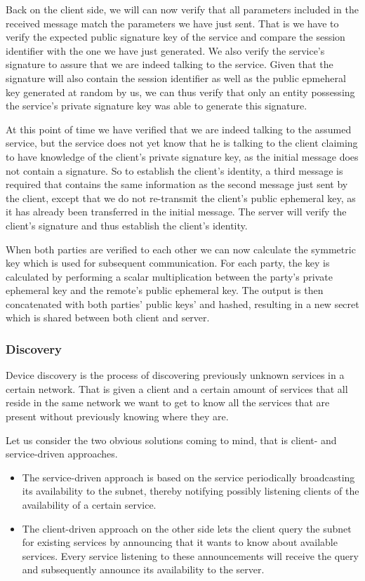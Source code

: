 Back on the client side, we will can now verify that all parameters included in the received message match the parameters we have just sent.
That is we have to verify the expected public signature key of the service and compare the session identifier with the one we have just generated.
We also verify the service's signature to assure that we are indeed talking to the service.
Given that the signature will also contain the session identifier as well as the public epmeheral key generated at random by us, we can thus verify that only an entity possessing the service's private signature key was able to generate this signature.

At this point of time we have verified that we are indeed talking to the assumed service, but the service does not yet know that he is talking to the client claiming to have knowledge of the client's private signature key, as the initial message does not contain a signature.
So to establish the client's identity, a third message is required that contains the same information as the second message just sent by the client, except that we do not re-transmit the client's public ephemeral key, as it has already been transferred in the initial message.
The server will verify the client's signature and thus establish the client's identity.

When both parties are verified to each other we can now calculate the symmetric key which is used for subsequent communication.
For each party, the key is calculated by performing a scalar multiplication between the party's private ephemeral key and the remote's public ephemeral key.
The output is then concatenated with both parties' public keys' and hashed, resulting in a new secret which is shared between both client and server.

\subsubsection{Discovery}
\label{sec:discovery}

Device discovery is the process of discovering previously unknown services in a certain network.
That is given a client and a certain amount of services that all reside in the same network we want to get to know all the services that are present without previously knowing where they are.

Let us consider the two obvious solutions coming to mind, that is client- and service-driven approaches.
\begin{itemize}
    \item The service-driven approach is based on the service periodically broadcasting its availability to the subnet, thereby notifying possibly listening clients of the availability of a certain service.
    \item The client-driven approach on the other side lets the client query the subnet for existing services by announcing that it wants to know about available services.
        Every service listening to these announcements will receive the query and subsequently announce its availability to the server.
\end{itemize}

